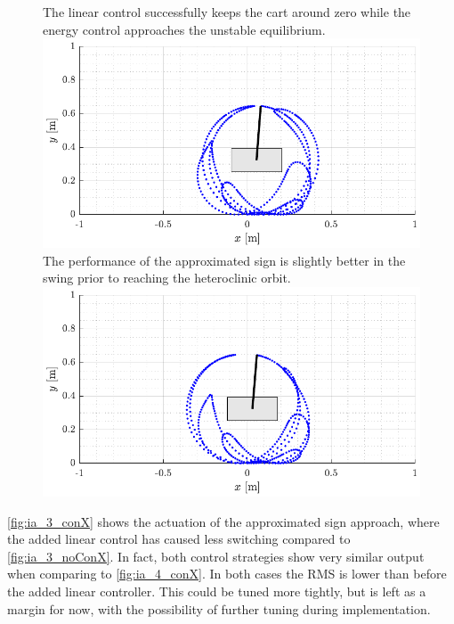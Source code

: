 \begin{figure}[H]
  \hspace{-10pt}
  \captionbox
  {
    The linear control successfully keeps the cart around zero while the energy control approaches the unstable equilibrium.
    \label{fig:ani_3_conX}
  }
  {
    \hspace{-1cm}
    \includegraphics[width=.46\textwidth]{figures/ani_3_conX}
  }
  \hspace{20pt}
  \captionbox 
  {
    The performance of the approximated sign is slightly better in the swing prior to reaching the heteroclinic orbit.
    \label{fig:ani_4_conX}
  }
  {
    \hspace{-1cm}
    \includegraphics[width=.46\textwidth]{figures/ani_4_conX}
  }  
\end{figure}
%
\autoref{fig:ia_3_conX} shows the actuation of the approximated sign approach, where the added linear control has caused less switching compared to \autoref{fig:ia_3_noConX}. In fact, both control strategies show very similar output when comparing to \autoref{fig:ia_4_conX}. In both cases the RMS is lower than before the added linear controller. This could be tuned more tightly, but is left as a margin for now, with the possibility of further tuning during implementation.
%
